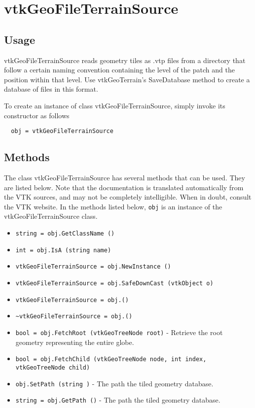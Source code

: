 \section{vtkGeoFileTerrainSource}

\subsection{Usage}

 vtkGeoFileTerrainSource reads geometry tiles as .vtp files from a
 directory that follow a certain naming convention containing the level
 of the patch and the position within that level. Use vtkGeoTerrain's
 SaveDatabase method to create a database of files in this format.

To create an instance of class vtkGeoFileTerrainSource, simply
invoke its constructor as follows
\begin{verbatim}
  obj = vtkGeoFileTerrainSource
\end{verbatim}
\subsection{Methods}

The class vtkGeoFileTerrainSource has several methods that can be used.
  They are listed below.
Note that the documentation is translated automatically from the VTK sources,
and may not be completely intelligible.  When in doubt, consult the VTK website.
In the methods listed below, \verb|obj| is an instance of the vtkGeoFileTerrainSource class.
\begin{itemize}
\item  \verb|string = obj.GetClassName ()|

\item  \verb|int = obj.IsA (string name)|

\item  \verb|vtkGeoFileTerrainSource = obj.NewInstance ()|

\item  \verb|vtkGeoFileTerrainSource = obj.SafeDownCast (vtkObject o)|

\item  \verb|vtkGeoFileTerrainSource = obj.()|

\item  \verb|~vtkGeoFileTerrainSource = obj.()|

\item  \verb|bool = obj.FetchRoot (vtkGeoTreeNode root)| -  Retrieve the root geometry representing the entire globe.

\item  \verb|bool = obj.FetchChild (vtkGeoTreeNode node, int index, vtkGeoTreeNode child)|

\item  \verb|obj.SetPath (string )| -  The path the tiled geometry database.

\item  \verb|string = obj.GetPath ()| -  The path the tiled geometry database.

\end{itemize}
